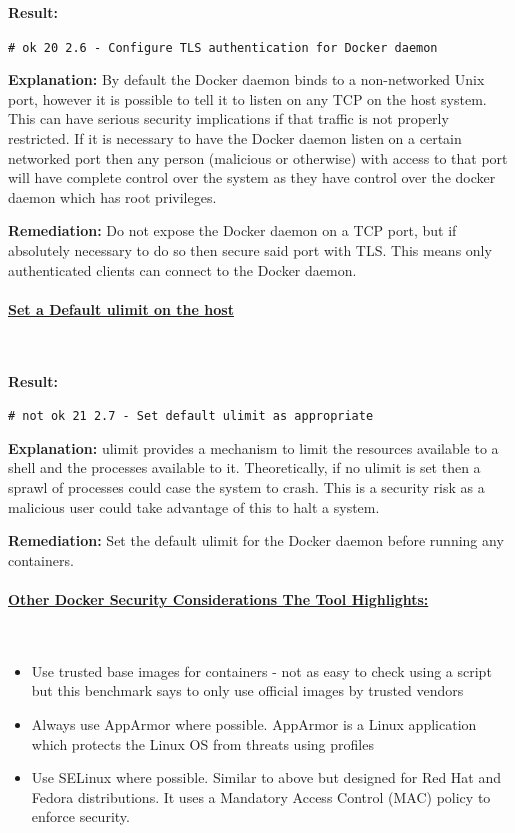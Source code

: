 \documentclass{article}
\begin{document}
\textbf{Result:} 

\texttt{\# ok 20 2.6  - Configure TLS authentication for Docker daemon}

\textbf{Explanation:} By default the Docker daemon binds to a non-networked Unix port, however it is possible to tell it to listen on any TCP on the host system. This can have serious security implications if that traffic is not properly restricted. If it is necessary to have the Docker daemon listen on a certain networked port then any person (malicious or otherwise) with access to that port will have complete control over the system as they have control over the docker daemon which has root privileges.

\textbf{Remediation:} Do not expose the Docker daemon on a TCP port, but if absolutely necessary to do so then secure said port with TLS. This means only authenticated clients can connect to the Docker daemon.

\paragraph{\underline{Set a Default ulimit on the host}}\mbox{}\\
\label{par:ulimit}

\textbf{Result:} 

\texttt{\# not ok 21 2.7 - Set default ulimit as appropriate}

\textbf{Explanation:} ulimit provides a mechanism to limit the resources available to a shell and the processes available to it. Theoretically, if no ulimit is set then a sprawl of processes could case the system to crash. This is a security risk as a malicious user could take advantage of this to halt a system.

\textbf{Remediation:} Set the default ulimit for the Docker daemon before running any containers.

\paragraph{\underline{Other Docker Security Considerations The Tool Highlights:}}\mbox{}\\

\begin{itemize}
  \item Use trusted base images for containers - not as easy to check using a script but this benchmark says to only use official images by trusted vendors
  \item Always use AppArmor where possible. AppArmor is a Linux application which protects the Linux OS from threats using profiles
  \item Use SELinux where possible. Similar to above but designed for Red Hat and Fedora distributions. It uses a Mandatory Access Control (MAC) policy to enforce security.
\end{itemize}
\end{document}
